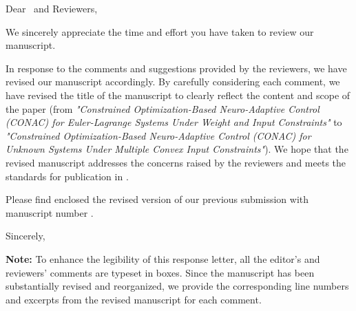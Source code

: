 Dear \theeditor\ and Reviewers,

\vspace{1.7em}

We sincerely appreciate the time and effort you have taken to review our manuscript.

\vspace{0.7em}

In response to the comments and suggestions provided by the reviewers, we have revised our manuscript accordingly.
By carefully considering each comment, we have revised the title of the manuscript to clearly reflect the content and scope of the paper (from \textit{"Constrained Optimization-Based Neuro-Adaptive Control (CONAC) for Euler-Lagrange Systems Under Weight and Input Constraints"} to \textit{"Constrained Optimization-Based Neuro-Adaptive Control (CONAC) for Unknown Systems Under Multiple Convex Input Constraints"}).
We hope that the revised manuscript addresses the concerns raised by the reviewers and meets the standards for publication in \thejournal.

\vspace{0.7em}

Please find enclosed the revised version of our previous submission with manuscript number \themanuscript.

\vspace{1.2em}

Sincerely,

\vspace{1.7em}

\theauthor

\vfil
\textbf{Note:} 
  To enhance the legibility of this response letter, all the editor's and reviewers' comments are typeset in boxes. 
  Since the manuscript has been substantially revised and reorganized, we provide the corresponding line numbers and excerpts from the revised manuscript for each comment.
  
  